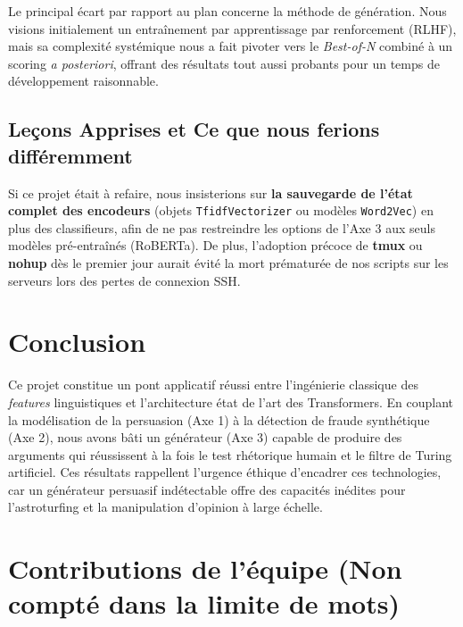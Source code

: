 \documentclass[11pt,a4paper]{article}
\begin{document}
Le principal écart par rapport au plan concerne la méthode de génération. Nous visions initialement un entraînement par apprentissage par renforcement (RLHF), mais sa complexité systémique nous a fait pivoter vers le \textit{Best-of-N} combiné à un scoring \textit{a posteriori}, offrant des résultats tout aussi probants pour un temps de développement raisonnable.

\subsection{Leçons Apprises et Ce que nous ferions différemment}
Si ce projet était à refaire, nous insisterions sur \textbf{la sauvegarde de l'état complet des encodeurs} (objets \texttt{TfidfVectorizer} ou modèles \texttt{Word2Vec}) en plus des classifieurs, afin de ne pas restreindre les options de l'Axe 3 aux seuls modèles pré-entraînés (RoBERTa). De plus, l'adoption précoce de \textbf{tmux} ou \textbf{nohup} dès le premier jour aurait évité la mort prématurée de nos scripts sur les serveurs lors des pertes de connexion SSH.

\section{Conclusion}

Ce projet constitue un pont applicatif réussi entre l'ingénierie classique des \textit{features} linguistiques et l'architecture état de l'art des Transformers. En couplant la modélisation de la persuasion (Axe 1) à la détection de fraude synthétique (Axe 2), nous avons bâti un générateur (Axe 3) capable de produire des arguments qui réussissent à la fois le test rhétorique humain et le filtre de Turing artificiel. 
Ces résultats rappellent l'urgence éthique d'encadrer ces technologies, car un générateur persuasif indétectable offre des capacités inédites pour l'astroturfing et la manipulation d'opinion à large échelle.

\section*{Contributions de l'équipe (Non compté dans la limite de mots)}
\end{document}
